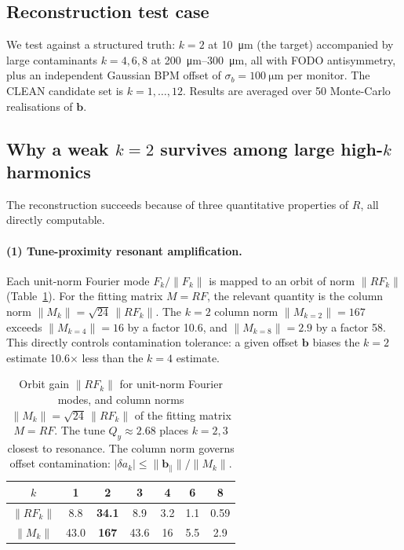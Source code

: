 \documentclass[preprint,12pt]{elsarticle}
\begin{document}
\subsection{Reconstruction test case}

We test against a structured truth: $k=2$ at \SI{10}{\micro\meter}
(the target) accompanied by large contaminants $k=4,6,8$ at
\SIrange{200}{300}{\micro\meter}, all with FODO antisymmetry, plus an
independent Gaussian BPM offset of $\sigma_b=\SI{100}{\micro\meter}$ per
monitor. The CLEAN candidate set is $k=1,\dots,12$. Results are averaged
over 50 Monte-Carlo realisations of $\mathbf{b}$.

\subsection{Why a weak $k=2$ survives among large high-$k$ harmonics}

The reconstruction succeeds because of three quantitative properties of
$R$, all directly computable.

\paragraph{(1) Tune-proximity resonant amplification.}
Each unit-norm Fourier mode $F_k/\|F_k\|$ is mapped to an orbit of norm
$\|RF_k\|$ (Table~\ref{tab:gain}). For the fitting matrix $M=RF$, the
relevant quantity is the column norm $\|M_k\|=\sqrt{24}\,\|RF_k\|$.
The $k=2$ column norm $\|M_{k=2}\|=167$ exceeds $\|M_{k=4}\|=16$
by a factor 10.6, and $\|M_{k=8}\|=2.9$ by a factor 58.
This directly controls contamination tolerance: a given offset $\mathbf{b}$
biases the $k=2$ estimate 10.6$\times$ less than the $k=4$ estimate.

\begin{table}[t]
\centering
\caption{Orbit gain $\|RF_k\|$ for unit-norm Fourier modes, and column norms
$\|M_k\|=\sqrt{24}\,\|RF_k\|$ of the fitting matrix $M=RF$.
The tune $Q_y\approx2.68$ places $k=2,3$ closest to resonance.
The column norm governs offset contamination: $|\delta a_k|\le\|\mathbf{b}_{\parallel}\|/\|M_k\|$.}
\label{tab:gain}
\begin{tabular}{ccccccc}
\toprule
$k$ & 1 & \textbf{2} & 3 & 4 & 6 & 8 \\
\midrule
$\|RF_k\|$ &  8.8 & \textbf{34.1} &  8.9 & 3.2 & 1.1 & 0.59 \\
$\|M_k\|$  & 43.0 & \textbf{167}  & 43.6 &  16 & 5.5 & 2.9  \\
\bottomrule
\end{tabular}
\end{table}
\end{document}
